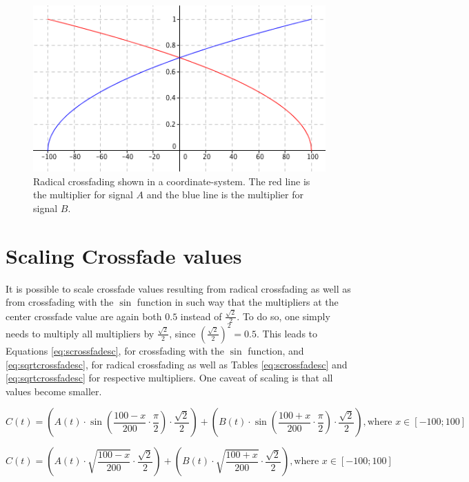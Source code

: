 \documentclass[12pt,twoside]{report}
\begin{document}
\begin{figure}[h!]

  \includegraphics[scale=0.7]{img/sqrtcrossfade}

  \caption{Radical crossfading shown in a coordinate-system. The red line is the multiplier for signal $A$ and the blue line is the multiplier for signal $B$.}

  \label{fig:sqrtcrossfade}

\end{figure}

\pagebreak

\section{Scaling Crossfade values}

It is possible to scale crossfade values resulting from radical crossfading as well as from crossfading with the $\sin$ function in such way that the multipliers at the center crossfade value are again both $0.5$ instead of $\frac{\sqrt{2}}{2}$. To do so, one simply needs to multiply all multipliers by $\frac{\sqrt{2}}{2}$, since $(\frac{\sqrt{2}}{2})^2 = 0.5$. This leads to Equations \ref{eq:scrossfadesc}, for crossfading with the $\sin$ function, and \ref{eq:sqrtcrossfadesc}, for radical crossfading as well as Tables \ref{eq:scrossfadesc} and \ref{eq:sqrtcrossfadesc} for respective multipliers. One caveat of scaling is that all values become smaller.

\begin{equation}
  C(t) = (A(t) \cdot \sin(\frac{100 - x}{200} \cdot \frac{\pi}{2}) \cdot \frac{\sqrt{2}}{2}) + (B(t) \cdot \sin(\frac{100 + x}{200} \cdot \frac{\pi}{2}) \cdot \frac{\sqrt{2}}{2}), \text{where } x \in [-100;100]
  \label{eq:scrossfadesc}
\end{equation}

\begin{equation}
  C(t) = (A(t) \cdot \sqrt{\frac{100 - x}{200}} \cdot \frac{\sqrt{2}}{2}) + (B(t) \cdot \sqrt{\frac{100 + x}{200}} \cdot \frac{\sqrt{2}}{2}), \text{where } x \in [-100;100]
  \label{eq:sqrtcrossfadesc}
\end{equation}
\end{document}
